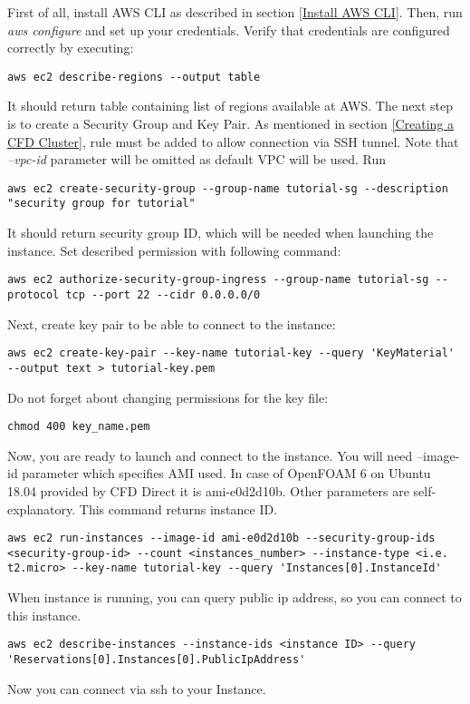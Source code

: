 \documentclass[11pt,english]{article}
\begin{document}
First of all, install AWS CLI as described in section \ref{Install AWS CLI}. Then, run \textit{aws configure} and set up your credentials.
Verify that credentials are configured correctly by executing:
\begin{lstlisting}
aws ec2 describe-regions --output table
\end{lstlisting}
It should return table containing list of regions available at AWS.
The next step is to create a Security Group and Key Pair. As mentioned in section \ref{Creating a CFD Cluster}, rule must be added to allow connection via SSH tunnel. Note that \textit{--vpc-id} parameter will be omitted as default VPC will be used. Run
\begin{lstlisting}
aws ec2 create-security-group --group-name tutorial-sg --description "security group for tutorial"
\end{lstlisting}
It should return security group ID, which will be needed when launching the instance. Set described permission with following command:
\begin{lstlisting}
aws ec2 authorize-security-group-ingress --group-name tutorial-sg --protocol tcp --port 22 --cidr 0.0.0.0/0
\end{lstlisting}
Next, create key pair to be able to connect to the instance:
\begin{lstlisting}
aws ec2 create-key-pair --key-name tutorial-key --query 'KeyMaterial' --output text > tutorial-key.pem
\end{lstlisting}
Do not forget about changing permissions for the key file:
\begin{lstlisting}
chmod 400 key_name.pem
\end{lstlisting}
Now, you are ready to launch and connect to the instance. You will need --image-id parameter which specifies AMI used. In case of OpenFOAM 6 on Ubuntu 18.04 provided by CFD Direct it is ami-e0d2d10b. Other parameters are self-explanatory. This command returns instance ID.
\begin{lstlisting}
aws ec2 run-instances --image-id ami-e0d2d10b --security-group-ids <security-group-id> --count <instances_number> --instance-type <i.e. t2.micro> --key-name tutorial-key --query 'Instances[0].InstanceId'
\end{lstlisting}
When instance is running, you can query public ip address, so you can connect to this instance.
\begin{lstlisting}
aws ec2 describe-instances --instance-ids <instance ID> --query 'Reservations[0].Instances[0].PublicIpAddress'
\end{lstlisting}
Now you can connect via ssh to your Instance.
\end{document}
